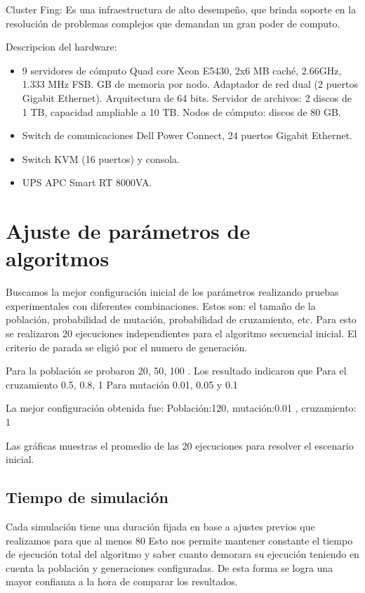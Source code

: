 Cluster Fing: Es una infraestructura de alto desempeño, que brinda soporte en la resolución de problemas complejos que demandan un gran poder de computo.

Descripcion del hardware: 
\begin{itemize}
	\item 9 servidores de cómputo
	\subitem Quad core Xeon E5430, 2x6 MB caché, 2.66GHz, 1.333 MHz FSB.
	 GB de memoria por nodo.
	\subitem Adaptador de red dual (2 puertos Gigabit Ethernet).
	\subitem  Arquitectura de 64 bits.
	\subitem Servidor de archivos: 2 discos de 1 TB, capacidad ampliable a 10 TB.
	\subitem Nodos de cómputo: discos de 80 GB.
	\item Switch de comunicaciones
	\subitem Dell Power Connect, 24 puertos Gigabit Ethernet.
	\item Switch KVM (16 puertos) y consola.
	\item UPS APC Smart RT 8000VA.
\end{itemize}

\section{Ajuste de parámetros de algoritmos}
Buscamos la mejor configuración inicial de los parámetros realizando pruebas experimentales con diferentes combinaciones.  Estos son: el tamaño de la población,  probabilidad de mutación, probabilidad de cruzamiento, etc.
Para esto se realizaron 20 ejecuciones independientes para el algoritmo secuencial inicial.
El criterio de parada se eligió por el numero de generación.

Para la población se probaron 20, 50, 100 . Los resultado indicaron que 
Para el cruzamiento 0.5, 0.8, 1
Para mutación 0.01, 0.05 y 0.1

La mejor  configuración obtenida fue:
Población:120, mutación:0.01 , cruzamiento: 1

Las gráficas muestras el promedio de las 20 ejecuciones para resolver el escenario inicial.


\subsection{Tiempo de simulación}

Cada simulación tiene una duración fijada en base a ajustes previos que realizamos para que al menos 80 %
Esto nos permite mantener constante el tiempo de ejecución total del algoritmo y saber cuanto demorara su ejecución teniendo en cuenta la población y generaciones configuradas. De esta forma se logra una mayor confianza a la hora de comparar los resultados.



